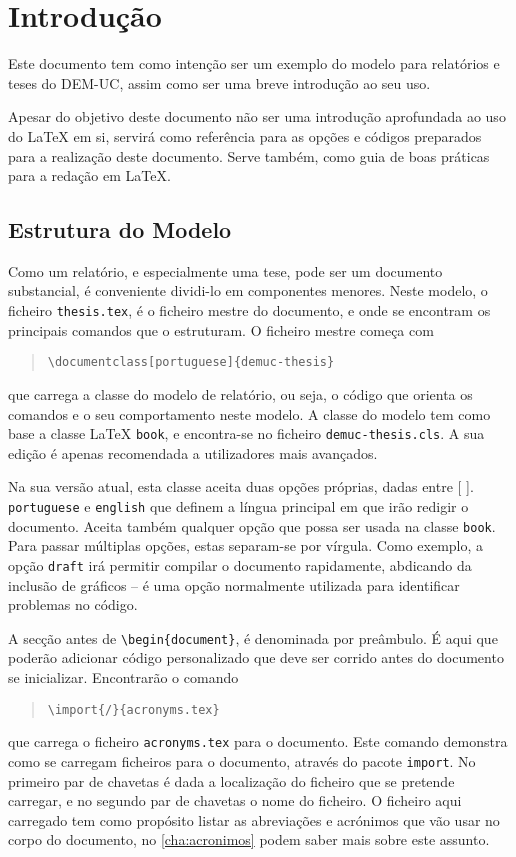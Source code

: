 \chapter{Introdução}

Este documento tem como intenção ser um exemplo do modelo para relatórios e teses do \ac{DEM-UC}, assim como ser uma breve introdução ao seu uso.

Apesar do objetivo deste documento não ser uma introdução aprofundada ao uso do \LaTeX{} em si, servirá como referência para as opções e códigos preparados para a realização deste documento. Serve também, como guia de boas práticas para a redação em \LaTeX{}.

\section{Estrutura do Modelo}

Como um relatório, e especialmente uma tese, pode ser um documento substancial, é conveniente dividi-lo em componentes menores. Neste modelo, o ficheiro \texttt{thesis.tex}, é o ficheiro mestre do documento, e onde se encontram os principais comandos que o estruturam. O ficheiro mestre começa com
\begin{quote}
    \texttt{\textbackslash documentclass[portuguese]\{demuc-thesis\}}
\end{quote}
que carrega a classe do modelo de relatório, ou seja, o código que orienta os comandos e o seu comportamento neste modelo. A classe do modelo tem como base a classe \LaTeX{} \texttt{book}, e encontra-se no ficheiro \texttt{demuc-thesis.cls}. A sua edição é apenas recomendada a utilizadores mais avançados.

Na sua versão atual, esta classe aceita duas opções próprias, dadas entre [ ]. \texttt{portuguese} e \texttt{english} que definem a língua principal em que irão redigir o documento. Aceita também qualquer opção que possa ser usada na classe \texttt{book}. Para passar múltiplas opções, estas separam-se por vírgula. Como exemplo, a opção \texttt{draft} irá permitir compilar o documento rapidamente, abdicando da inclusão de gráficos -- é uma opção normalmente utilizada para identificar problemas no código.

\cite{Geim2001}

A secção antes de \texttt{\textbackslash begin\{document\}}, é denominada por preâmbulo. É aqui que poderão adicionar código personalizado que deve ser corrido antes do documento se inicializar. Encontrarão o comando
\begin{quote}
    \texttt{\textbackslash import\{/\}\{acronyms.tex\}}
\end{quote}
que carrega o ficheiro \texttt{acronyms.tex} para o documento. Este comando demonstra como se carregam ficheiros para o documento, através do pacote \texttt{import}. No primeiro par de chavetas é dada a localização do ficheiro que se pretende carregar, e no segundo par de chavetas o nome do ficheiro. O ficheiro aqui carregado tem como propósito listar as abreviações e acrónimos que vão usar no corpo do documento, no \cref{cha:acronimos} podem saber mais sobre este assunto.

